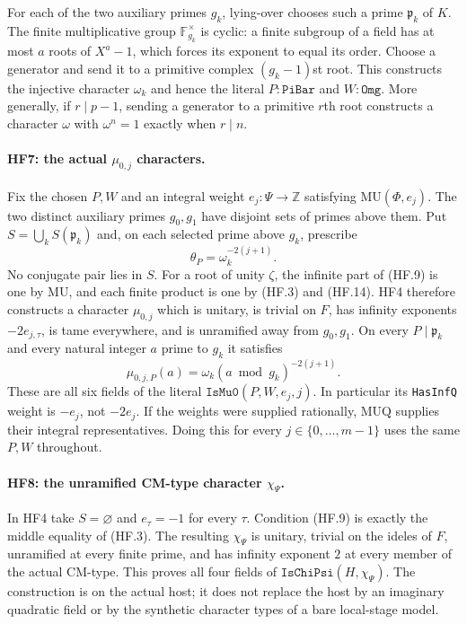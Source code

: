 For each of the two auxiliary primes $g_k$, lying-over chooses
such a prime $\mathfrak p_k$ of $K$. The finite multiplicative
group $\mathbb F_{g_k}^\times$ is cyclic: a finite subgroup of
a field has at most $a$ roots of $X^a-1$, which forces its
exponent to equal its order. Choose a generator and send it
to a primitive complex $(g_k-1)$st root. This constructs
the injective character $\omega_k$ and hence the literal
$P:\texttt{PiBar}$ and $W:\texttt{Omg}$.
More generally, if $r\mid p-1$, sending a generator to a
primitive $r$th root constructs a character $\omega$ with
$\omega^n=1$ exactly when $r\mid n$.

\paragraph{HF7: the actual $\mu_{0,j}$ characters.}
Fix the chosen $P,W$ and an integral weight
$e_j:\Psi\to\mathbb Z$ satisfying $\mathrm{MU}(\Phi,e_j)$.
The two distinct auxiliary primes $g_0,g_1$ have disjoint
sets of primes above them. Put
$S=\bigcup_k S(\mathfrak p_k)$ and, on each selected prime
above $g_k$, prescribe
\[
             \theta_P=\omega_k^{-2(j+1)}.             \tag{HF.15}
\]
No conjugate pair lies in $S$. For a root of unity $\zeta$,
the infinite part of (HF.9) is one by $\mathrm{MU}$, and
each finite product is one by (HF.3) and (HF.14).
HF4 therefore constructs a character $\mu_{0,j}$ which
is unitary, is trivial on $F$, has infinity exponents
$-2e_{j,\tau}$, is tame everywhere, and is unramified
away from $g_0,g_1$. On every $P\mid\mathfrak p_k$ and
every natural integer $a$ prime to $g_k$ it satisfies
\[
       \mu_{0,j,P}(a)
             =\omega_k(a\bmod g_k)^{-2(j+1)}.          \tag{HF.16}
\]
These are all six fields of the literal
$\texttt{IsMu0}(P,W,e_j,j)$.
In particular its \texttt{HasInfQ} weight is $-e_j$,
not $-2e_j$. If the weights were supplied rationally,
$\mathrm{MUQ}$ supplies their integral representatives.
Doing this for every $j\in\{0,\ldots,m-1\}$ uses the same
$P,W$ throughout.

\paragraph{HF8: the unramified CM-type character $\chi_\Psi$.}
In HF4 take $S=\varnothing$ and $e_\tau=-1$ for every
$\tau$. Condition (HF.9) is exactly the middle equality
of (HF.3). The resulting $\chi_\Psi$ is unitary, trivial
on the ideles of $F$, unramified at every finite prime,
and has infinity exponent $2$ at every member of the
actual CM-type. This proves all four fields of
$\texttt{IsChiPsi}(H,\chi_\Psi)$.
The construction is on the actual host; it does not replace
the host by an imaginary quadratic field or by the synthetic
character types of a bare local-stage model.

